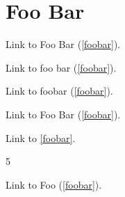 
\def\mytitle{Link Variations}


\chapter{Foo Bar }
\label{foobar}

Link to Foo Bar (\autoref{foobar}).

Link to foo bar (\autoref{foobar}).

Link to foobar (\autoref{foobar}).

Link to Foo Bar (\autoref{foobar}).

Link to \autoref{foobar}.

5

Link to Foo (\autoref{foobar}).



